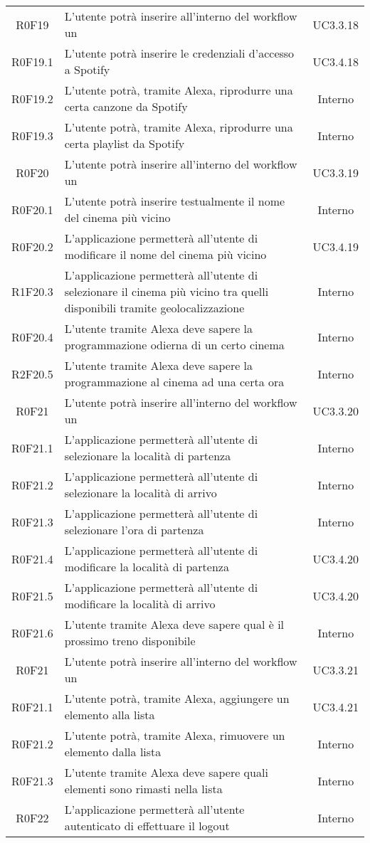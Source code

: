 \begin{center}
\begin{longtable}{cm{8cm}c }
	R0F19 & L'utente potrà inserire all'interno del workflow un \BSpotify{} & UC3.3.18 \\
	R0F19.1 & L'utente potrà inserire le credenziali d'accesso a Spotify  & UC3.4.18 \\
	R0F19.2 & L'utente potrà, tramite Alexa, riprodurre una certa canzone da Spotify & Interno \\
	R0F19.3 & L'utente potrà, tramite Alexa, riprodurre una certa playlist da Spotify & Interno \\
	R0F20 & L'utente potrà inserire all'interno del workflow un \BCinema{} & UC3.3.19 \\
	R0F20.1 & L'utente potrà inserire testualmente il nome del cinema più vicino  & Interno \\
	R0F20.2 & L'applicazione permetterà all'utente di modificare il nome del cinema più vicino  & UC3.4.19 \\
	R1F20.3 & L'applicazione permetterà all'utente di selezionare il cinema più vicino tra quelli disponibili tramite geolocalizzazione  & Interno \\
	R0F20.4 & L'utente tramite Alexa deve sapere la programmazione odierna di un certo cinema & Interno \\
	R2F20.5 & L'utente tramite Alexa deve sapere la programmazione al cinema ad una certa ora & Interno \\
	R0F21 & L'utente potrà inserire all'interno del workflow un \BTrasporti{} & UC3.3.20 \\
	R0F21.1 & L'applicazione permetterà all'utente di selezionare la località di partenza  & Interno \\
	R0F21.2 & L'applicazione permetterà all'utente di selezionare la località di arrivo  & Interno \\
	R0F21.3 & L'applicazione permetterà all'utente di selezionare l'ora di partenza  & Interno \\
	R0F21.4 & L'applicazione permetterà all'utente di modificare la località di partenza & UC3.4.20 \\
	R0F21.5 & L'applicazione permetterà all'utente di modificare la località di arrivo & UC3.4.20 \\
	R0F21.6 & L'utente tramite Alexa deve sapere qual è il prossimo treno disponibile & Interno \\
	R0F21 & L'utente potrà inserire all'interno del workflow un \BLista{} & UC3.3.21 \\
	R0F21.1 & L'utente potrà, tramite Alexa, aggiungere un elemento alla lista & UC3.4.21 \\
	R0F21.2 & L'utente potrà, tramite Alexa, rimuovere un elemento dalla lista  & Interno \\
	R0F21.3 & L'utente tramite Alexa deve sapere quali elementi sono rimasti nella lista & Interno \\
	R0F22 & L'applicazione permetterà all'utente autenticato di effettuare il logout &  Interno\\ 	
	

\end{longtable}
\end{center}
